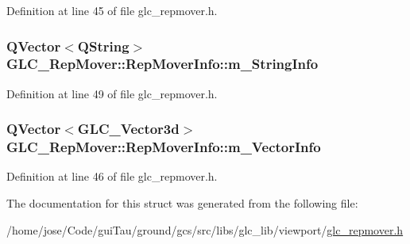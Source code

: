 Definition at line 45 of file glc\-\_\-repmover.\-h.

\hypertarget{struct_g_l_c___rep_mover_1_1_rep_mover_info_a8e8f2f5fea330ef3d5dd58522ee20d59}{
\subsubsection[{m\-\_\-\-String\-Info}]{\setlength{\rightskip}{0pt plus 5cm}Q\-Vector$<${\bf Q\-String}$>$ G\-L\-C\-\_\-\-Rep\-Mover\-::\-Rep\-Mover\-Info\-::m\-\_\-\-String\-Info}}\label{struct_g_l_c___rep_mover_1_1_rep_mover_info_a8e8f2f5fea330ef3d5dd58522ee20d59}


Definition at line 49 of file glc\-\_\-repmover.\-h.

\hypertarget{struct_g_l_c___rep_mover_1_1_rep_mover_info_a8be17904a57a01729fd6afe9c9518703}{
\subsubsection[{m\-\_\-\-Vector\-Info}]{\setlength{\rightskip}{0pt plus 5cm}Q\-Vector$<${\bf G\-L\-C\-\_\-\-Vector3d}$>$ G\-L\-C\-\_\-\-Rep\-Mover\-::\-Rep\-Mover\-Info\-::m\-\_\-\-Vector\-Info}}\label{struct_g_l_c___rep_mover_1_1_rep_mover_info_a8be17904a57a01729fd6afe9c9518703}


Definition at line 46 of file glc\-\_\-repmover.\-h.



The documentation for this struct was generated from the following file\-:\begin{DoxyCompactItemize}
\item 
/home/jose/\-Code/gui\-Tau/ground/gcs/src/libs/glc\-\_\-lib/viewport/\hyperlink{glc__repmover_8h}{glc\-\_\-repmover.\-h}\end{DoxyCompactItemize}
